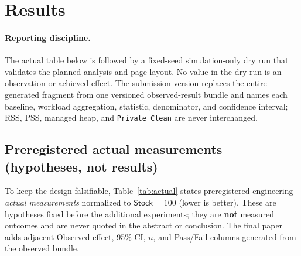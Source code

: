 \documentclass[acmsmall,screen]{acmart}
\newif\ifincludesimulation
\begin{document}
\section{Results}
\label{sec:results}

\paragraph{Reporting discipline.}
The actual table below is followed by a fixed-seed simulation-only dry run
that validates the planned analysis and page layout. No value in the dry run
is an observation or achieved effect. The submission version replaces the
entire generated fragment from one versioned observed-result bundle and names
each baseline, workload aggregation, statistic, denominator, and confidence
interval; RSS, PSS, managed heap, and \texttt{Private\_Clean} are never
interchanged.

\ifincludesimulation
\subsection{Preregistered actual measurements (hypotheses, not results)}
\label{sec:actual}
To keep the design falsifiable, Table~\ref{tab:actual} states
preregistered engineering \emph{actual measurements} normalized to
$\textsf{Stock}=100$ (lower is better). These are hypotheses fixed before
the additional experiments; they are \textbf{not} measured outcomes and are
never quoted in the abstract or conclusion. The final paper adds adjacent
\textsf{Observed effect}, \textsf{95\% CI}, $n$, and \textsf{Pass/Fail}
columns generated from the observed bundle.
\end{document}
